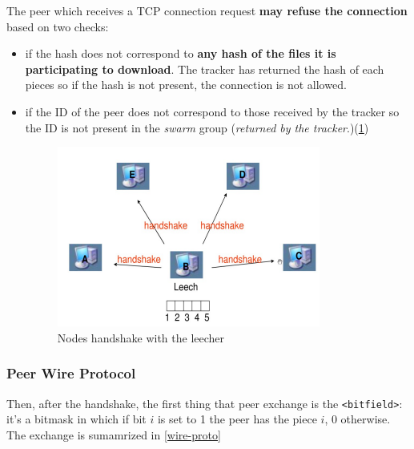\documentclass[10pt,a4paper]{report}
\begin{document}
The peer which receives a TCP connection request \textbf{may refuse the connection} based on two checks:
\begin{itemize}
	\item 
	if the hash does not correspond to \textbf{any hash of the files it is participating to download}. The tracker has returned the hash of each pieces so if the hash is not present, the connection is not allowed.
	\item 
	if the ID of the peer does not correspond to those received by the tracker so the ID is not present in the \textit{swarm} group (\textit{returned by the tracker}.)(\ref{handshake})
	\begin{figure}[b]
		\centering
		\includegraphics[scale=0.50]{images/Pasted image 20230311105313.png}
		\caption{Nodes handshake with the leecher}
		\label{handshake}
	\end{figure}
	

\end{itemize}
\subsubsection{Peer Wire Protocol}\label{sec:peer-wire-protocol}
Then, after the handshake, the first thing that peer exchange is the \texttt{<bitfield>}: it's a bitmask in which if bit $i$ is set to 1 the peer has the piece $i$, 0 otherwise. The exchange is sumamrized in \ref{wire-proto}
\end{document}
